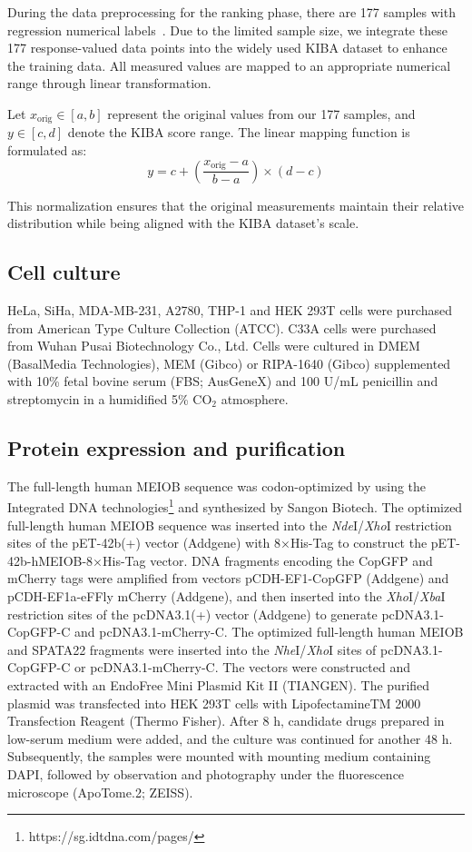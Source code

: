 \documentclass[unnumsec,webpdf,contemporary,large]{oup-authoring-template}%
\theoremstyle{thmstyleone}%
\theoremstyle{thmstyletwo}%
\theoremstyle{thmstylethree}%
\begin{document}
During the data preprocessing for the ranking phase, there are 177 samples with regression numerical labels~\cite{67}. Due to the limited sample size, we integrate these 177 response-valued data points into the widely used KIBA dataset to enhance the training data. All measured values are mapped to an appropriate numerical range through linear transformation.

Let $x_{\text{orig}} \in [a,b]$ represent the original values from our 177 samples, and $y \in [c,d]$ denote the KIBA score range. The linear mapping function is formulated as:
\begin{equation}
y = c + \left( \frac{x_{\text{orig}} - a}{b - a} \right) \times (d - c)
\end{equation}

This normalization ensures that the original measurements maintain their relative distribution while being aligned with the KIBA dataset's scale.


\subsection*{Cell culture}

HeLa, SiHa, MDA-MB-231, A2780, THP-1 and HEK 293T cells were purchased from American Type Culture Collection (ATCC). C33A cells were purchased from Wuhan Pusai Biotechnology Co., Ltd. Cells were cultured in DMEM (BasalMedia Technologies), MEM (Gibco) or RIPA-1640 (Gibco) supplemented with 10\% fetal bovine serum (FBS; AusGeneX) and 100 U/mL penicillin and streptomycin in a humidified 5\% CO$_2$ atmosphere. 


\subsection*{Protein expression and purification}
The full-length human MEIOB sequence was codon-optimized by using the Integrated DNA technologies\footnote{https://sg.idtdna.com/pages/} and synthesized by Sangon Biotech. The optimized full-length human MEIOB sequence was inserted into the \textit{Nde}I/\textit{Xho}I restriction sites of the pET-42b(+) vector (Addgene) with 8×His-Tag to construct the pET-42b-hMEIOB-8×His-Tag vector. DNA fragments encoding the CopGFP and mCherry tags were amplified from vectors pCDH-EF1-CopGFP (Addgene) and pCDH-EF1a-eFFly mCherry (Addgene), and then inserted into the \textit{Xho}I/\textit{Xba}I restriction sites of the pcDNA3.1(+) vector (Addgene) to generate pcDNA3.1-CopGFP-C and pcDNA3.1-mCherry-C. The optimized full-length human MEIOB and SPATA22 fragments were inserted into the \textit{Nhe}I/\textit{Xho}I sites of pcDNA3.1-CopGFP-C or pcDNA3.1-mCherry-C. The vectors were constructed and extracted with an EndoFree Mini Plasmid Kit II (TIANGEN). The purified plasmid was transfected into HEK 293T cells with LipofectamineTM 2000 Transfection Reagent (Thermo Fisher). After 8 h, candidate drugs prepared in low-serum medium were added, and the culture was continued for another 48 h. Subsequently, the samples were mounted with mounting medium containing DAPI, followed by observation and photography under the fluorescence microscope (ApoTome.2; ZEISS).
\end{document}

